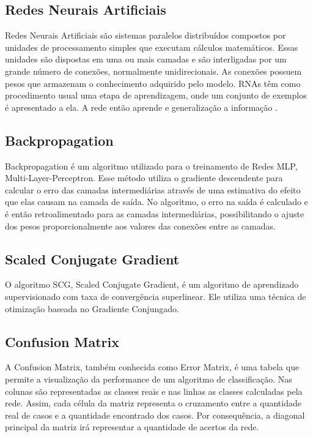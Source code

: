 \subsection{Redes Neurais Artificiais}

Redes Neurais Artificiais são sistemas paralelos distribuídos compostos por unidades de processamento simples que executam cálculos matemáticos. Essas unidades são dispostas em uma ou mais camadas e são interligadas por um grande número de conexões, normalmente unidirecionais. As conexões possuem pesos que armazenam o conhecimento adquirido pelo modelo. RNAs têm como procedimento usual uma etapa de aprendizagem, onde um conjunto de exemplos é apresentado a ela. A rede então aprende e generalização a informação \cite{bib-braga}.

\subsection{Backpropagation}

Backpropagation é um algoritmo utilizado para o treinamento de Redes MLP, Multi-Layer-Perceptron. Esse método utiliza o gradiente descendente para calcular o erro das camadas intermediárias através de uma estimativa do efeito que elas causam na camada de saída. No algoritmo, o erro na saída é calculado e é então retroalimentado para as camadas intermediárias, possibilitando o ajuste dos pesos proporcionalmente aos valores das conexões entre as camadas.

\subsection{Scaled Conjugate Gradient}

O algoritmo SCG, Scaled Conjugate Gradient, é um algoritmo de aprendizado supervisionado com taxa de convergência superlinear. Ele utiliza uma técnica de otimização baseada no Gradiente Conjungado. \cite{bib-moller}

\subsection{Confusion Matrix}

A Confusion Matrix, também conhecida como Error Matrix, é uma tabela que permite a visualização da performance de um algoritmo de classificação. Nas colunas são representadas as classes reais e nas linhas as classes calculadas pela rede. Assim, cada célula da matriz representa o cruzamento entre a quantidade real de casos e a quantidade encontrado dos casos. Por consequência, a diagonal principal  da matriz irá representar a quantidade de acertos da rede.